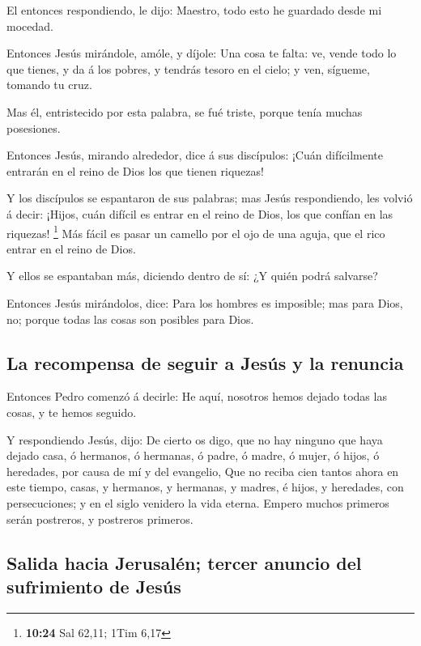  El entonces respondiendo, le dijo: Maestro, todo esto he
guardado desde mi mocedad.

 Entonces Jesús mirándole, amóle, y díjole: Una cosa te
falta: ve, vende todo lo que tienes, y da á los pobres, y tendrás tesoro
en el cielo; y ven, sígueme, tomando tu cruz.

 Mas él, entristecido por esta palabra, se fué triste,
porque tenía muchas posesiones.

 Entonces Jesús, mirando alrededor, dice á sus
discípulos: ¡Cuán difícilmente entrarán en el reino de Dios los que
tienen riquezas!

 Y los discípulos se espantaron de sus palabras; mas
Jesús respondiendo, les volvió á decir: ¡Hijos, cuán difícil es entrar
en el reino de Dios, los que confían en las riquezas! \footnote{\textbf{10:24}
  Sal 62,11; 1Tim 6,17}  Más fácil es pasar un camello
por el ojo de una aguja, que el rico entrar en el reino de Dios.

 Y ellos se espantaban más, diciendo dentro de sí: ¿Y
quién podrá salvarse?

 Entonces Jesús mirándolos, dice: Para los hombres es
imposible; mas para Dios, no; porque todas las cosas son posibles para
Dios.

\hypertarget{la-recompensa-de-seguir-a-jesuxfas-y-la-renuncia}{%
\subsection{La recompensa de seguir a Jesús y la
renuncia}\label{la-recompensa-de-seguir-a-jesuxfas-y-la-renuncia}}

 Entonces Pedro comenzó á decirle: He aquí, nosotros
hemos dejado todas las cosas, y te hemos seguido.

 Y respondiendo Jesús, dijo: De cierto os digo, que no
hay ninguno que haya dejado casa, ó hermanos, ó hermanas, ó padre, ó
madre, ó mujer, ó hijos, ó heredades, por causa de mí y del evangelio,
 Que no reciba cien tantos ahora en este tiempo, casas, y
hermanos, y hermanas, y madres, é hijos, y heredades, con persecuciones;
y en el siglo venidero la vida eterna.  Empero muchos
primeros serán postreros, y postreros primeros.

\hypertarget{salida-hacia-jerusaluxe9n-tercer-anuncio-del-sufrimiento-de-jesuxfas}{%
\subsection{Salida hacia Jerusalén; tercer anuncio del sufrimiento de
Jesús}\label{salida-hacia-jerusaluxe9n-tercer-anuncio-del-sufrimiento-de-jesuxfas}}


